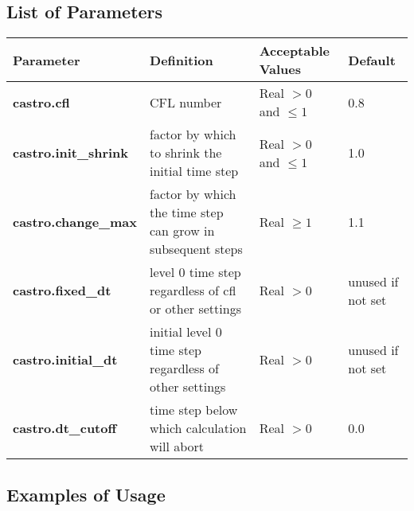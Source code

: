 \subsection{List of Parameters}

\begin{table*}[h]
\begin{scriptsize}
\begin{center}
\begin{tabular}{|l|l|l|l|} \hline
Parameter & Definition & Acceptable Values &Default\\
\hline
{\bf castro.cfl} & CFL number & Real $> 0$ and $\leq 1$ & 0.8 \\ 
{\bf castro.init\_shrink} & factor by which to shrink the initial time step & Real $> 0$ and $\leq 1$ & 1.0 \\ 
{\bf castro.change\_max} & factor by which the time step can grow in subsequent steps & Real $\geq 1$ & 1.1 \\ 
{\bf castro.fixed\_dt} &  level 0 time step regardless of cfl or other settings & Real $> 0$ & unused if not set \\
{\bf castro.initial\_dt} &  initial level 0 time step regardless of other settings & Real $> 0$ & unused if not set \\
{\bf castro.dt\_cutoff} & time step below which calculation will abort & Real $> 0$ & 0.0 \\
\hline
\end{tabular}
\label{Table:TimeStepInputs}
\end{center}
\end{scriptsize}
\end{table*}

\subsection{Examples of Usage}

